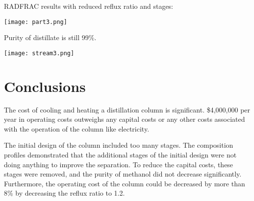 \documentclass[12pt]{article}
\begin{document}
RADFRAC results with reduced reflux ratio and stages:

\texttt{[image: part3.png]}

Purity of distillate is still 99\%.

\texttt{[image: stream3.png]}



\section{Conclusions}

The cost of cooling and heating a distillation column is significant. \$4,000,000 per year in operating costs outweighs any capital costs or any other costs associated with the operation of the column like electricity.

The initial design of the column included too many stages. The composition profiles demonstrated that the additional stages of the initial design were not doing anything to improve the separation. To reduce the capital costs, these stages were removed, and the purity of methanol did not decrease significantly. Furthermore, the operating cost of the column could be decreased by more than 8\% by decreasing the reflux ratio to 1.2.
\end{document}

